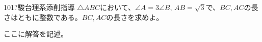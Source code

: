 \begin{prob}{101}{\hosi ?}{駿台理系添削指導}
 $\triangle{ABC}$において、$\angle{A}=3\angle{B}$, $AB=\sqrt{3}$で、$BC, AC$の長さはともに整数である。$BC, AC$の長さを求めよ。
\end{prob}
ここに解答を記述。